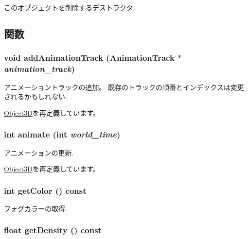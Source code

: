 このオブジェクトを削除するデストラクタ. 

\subsection{関数}
\hypertarget{classm3g_1_1Fog_415c0b110f95410ded9b85e5d99a496b}{
\subsubsection[{addAnimationTrack}]{\setlength{\rightskip}{0pt plus 5cm}void addAnimationTrack ({\bf AnimationTrack} $\ast$ {\em animation\_\-track})}}
\label{classm3g_1_1Fog_415c0b110f95410ded9b85e5d99a496b}


アニメーショントラックの追加。 既存のトラックの順番とインデックスは変更されるかもしれない. 

\hyperlink{classm3g_1_1Object3D_415c0b110f95410ded9b85e5d99a496b}{Object3D}を再定義しています。\hypertarget{classm3g_1_1Fog_8aad1ceab4c2a03609c8a42324ce484d}{
\subsubsection[{animate}]{\setlength{\rightskip}{0pt plus 5cm}int animate (int {\em world\_\-time})}}
\label{classm3g_1_1Fog_8aad1ceab4c2a03609c8a42324ce484d}


アニメーションの更新. 

\hyperlink{classm3g_1_1Object3D_8aad1ceab4c2a03609c8a42324ce484d}{Object3D}を再定義しています。\hypertarget{classm3g_1_1Fog_4cfa1931c265ec3412fe3f6408a1b4f5}{
\subsubsection[{getColor}]{\setlength{\rightskip}{0pt plus 5cm}int getColor () const}}
\label{classm3g_1_1Fog_4cfa1931c265ec3412fe3f6408a1b4f5}


フォグカラーの取得. \hypertarget{classm3g_1_1Fog_31deef556a6aa5e519d3c79bd9c383c0}{
\subsubsection[{getDensity}]{\setlength{\rightskip}{0pt plus 5cm}float getDensity () const}}
\label{classm3g_1_1Fog_31deef556a6aa5e519d3c79bd9c383c0}


